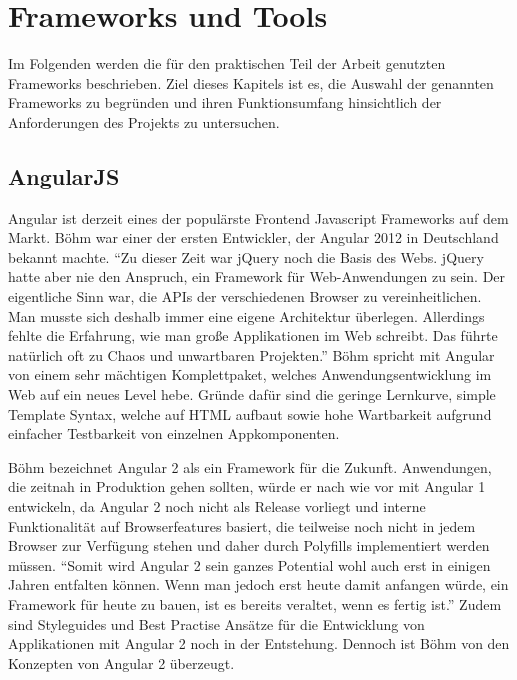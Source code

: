 
\chapter{Frameworks und Tools}
\label{chap:frameworks}

Im Folgenden werden die für den praktischen Teil der Arbeit genutzten Frameworks beschrieben.
Ziel dieses Kapitels ist es, die Auswahl der genannten Frameworks zu begründen und
ihren Funktionsumfang hinsichtlich der Anforderungen des Projekts zu untersuchen.

\section{AngularJS}

Angular ist derzeit eines der populärste Frontend Javascript Frameworks auf dem Markt.
Böhm war einer der ersten Entwickler, der Angular 2012 in Deutschland bekannt machte.
``Zu dieser Zeit war jQuery noch die Basis des Webs. jQuery hatte aber nie den Anspruch, ein Framework für Web-Anwendungen zu sein. Der eigentliche Sinn war, die APIs der verschiedenen Browser zu vereinheitlichen.
Man musste sich deshalb immer eine eigene Architektur überlegen. Allerdings fehlte die Erfahrung, wie man große Applikationen im Web schreibt. Das führte natürlich oft zu Chaos und unwartbaren Projekten.''\cite{Angu68:online}
Böhm spricht mit Angular von einem sehr mächtigen Komplettpaket, welches Anwendungsentwicklung im Web auf ein neues Level hebe.
Gründe dafür sind die geringe Lernkurve, simple Template Syntax,
welche auf HTML aufbaut sowie hohe Wartbarkeit aufgrund einfacher Testbarkeit von einzelnen Appkomponenten.

Böhm bezeichnet Angular 2 als ein Framework für die Zukunft.
Anwendungen, die zeitnah in Produktion gehen sollten, würde er nach wie vor mit Angular 1 entwickeln,
da Angular 2 noch nicht als Release vorliegt und interne Funktionalität auf Browserfeatures basiert,
die teilweise noch nicht in jedem Browser zur Verfügung stehen und daher durch Polyfills implementiert werden müssen.
``Somit wird Angular 2 sein ganzes Potential wohl auch erst in einigen Jahren entfalten können.
Wenn man jedoch erst heute damit anfangen würde, ein Framework für heute zu bauen,
ist es bereits veraltet, wenn es fertig ist.''\cite{Angu68:online}
Zudem sind Styleguides und Best Practise Ansätze für die Entwicklung von Applikationen mit Angular 2
noch in der Entstehung.
Dennoch ist Böhm von den Konzepten von Angular 2 überzeugt.


